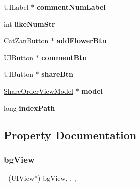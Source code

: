 \begin{DoxyCompactItemize}
U\+I\+Label $\ast$ {\bfseries comment\+Num\+Label}
\item 
\mbox{\label{interface_share_order_view_cell_a7c9861ed71ce4a91aa0709a7f1303387}} 
int {\bfseries like\+Num\+Str}
\item 
\mbox{\label{interface_share_order_view_cell_ab48746cd959fc33ca962b2367cf811d1}} 
\mbox{\hyperlink{interface_cat_zan_button}{Cat\+Zan\+Button}} $\ast$ {\bfseries add\+Flower\+Btn}
\item 
\mbox{\label{interface_share_order_view_cell_a139892f0fb2a6ac516c2478ad1981353}} 
U\+I\+Button $\ast$ {\bfseries comment\+Btn}
\item 
\mbox{\label{interface_share_order_view_cell_a11d4ea8481707b5bb433dddc4c0cbfdb}} 
U\+I\+Button $\ast$ {\bfseries share\+Btn}
\item 
\mbox{\label{interface_share_order_view_cell_a008461b6531190ec4b11f5fc1f3559d8}} 
\mbox{\hyperlink{interface_share_order_view_model}{Share\+Order\+View\+Model}} $\ast$ {\bfseries model}
\item 
\mbox{\label{interface_share_order_view_cell_a53733a1a50ebc2dbd87b5bdffbaf0c27}} 
long {\bfseries index\+Path}
\end{DoxyCompactItemize}


\subsection{Property Documentation}
\mbox{\label{interface_share_order_view_cell_af34332fb970f69c03eceead530713b18}} 
\subsubsection{\texorpdfstring{bg\+View}{bgView}}
{\footnotesize\ttfamily -\/ (U\+I\+View$\ast$) bg\+View\hspace{0.3cm}{\ttfamily [read]}, {\ttfamily [write]}, {\ttfamily [nonatomic]}, {\ttfamily [strong]}}

